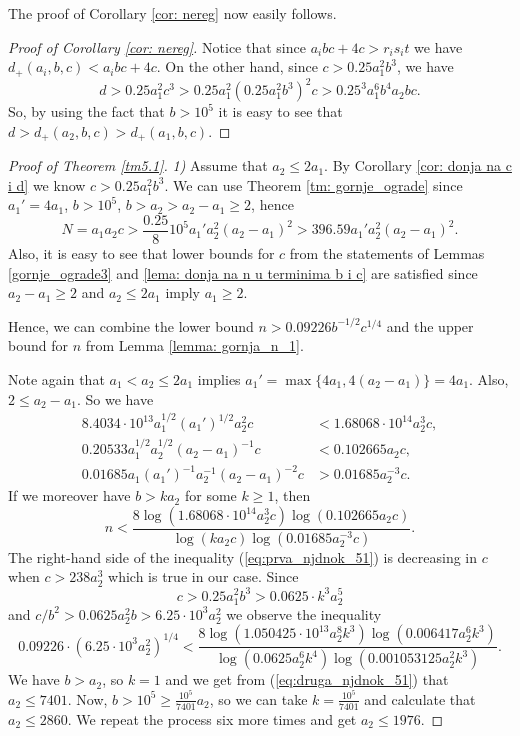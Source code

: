 \documentclass[12pt]{amsart}%
\theoremstyle{definition}
\theoremstyle{remark}
\theoremstyle{plain}
\begin{document}
The proof of Corollary \ref{cor: nereg} now easily follows.

\begin{proof}[Proof of Corollary \ref{cor: nereg}]
Notice that since $a_ibc+4c>r_is_it$ we have $d_+(a_i,b,c) < a_ibc + 4c$. On the other hand, since $c>0.25a_1^2b^3$, we have 
$$d>0.25a_1^2c^3>0.25a_1^2(0.25a_1^2b^3)^2c>0.25^3a_1^6b^4a_2bc.$$
So, by using the fact that $b>10^5$ it is easy to see that $d>d_+(a_2,b,c)>d_+(a_1,b,c)$.
\end{proof}



\begin{proof}[Proof of Theorem \ref{tm5.1}]
\emph{1)} Assume that $a_2\leq 2a_1$.
By Corollary \ref{cor: donja na c i d} we know $c>0.25a_1^2b^3$. We can use Theorem \ref{tm: gornje_ograde} since $a_1'=4a_1$, $b>10^5$, $b>a_2>a_2-a_1\geq 2$, hence 
$$N=a_1a_2c>\frac{0.25}{8}10^5a_1'a_2^2(a_2-a_1)^2>396.59a_1'a_2^2(a_2-a_1)^2.$$
Also, it is easy to see that lower bounds for $c$ from the statements of Lemmas \ref{gornje_ograde3}  and \ref{lema: donja na n u terminima b i c} are satisfied since $a_2-a_1\geq 2$ and $a_2\leq 2a_1$ imply $a_1\geq 2$.

Hence, we can combine the lower bound $n>0.09226b^{-1/2}c^{1/4}$ and the upper bound for $n$ from Lemma \ref{lemma: gornja_n_1}.

 Note again that $a_1<a_2\leq 2a_1$ implies $a_1'=\max\{4a_1,4(a_2-a_1)\}=4a_1$. Also, $2\leq a_2-a_1$. So we have
\begin{align*}
 8.4034\cdot 10^{13}a_1^{1/2}(a_1')^{1/2}a_2^2c&<1.68068\cdot 10^{14}a_2^3c,\\
 0.20533a_1^{1/2}a_2^{1/2}(a_2-a_1)^{-1}c&<0.102665a_2c,\\
 0.01685a_1(a_1')^{-1}a_2^{-1}(a_2-a_1)^{-2}c&>0.01685a_2^{-3}c.
\end{align*}
If we moreover have $b>ka_2$ for some $k\geq1$, then
\begin{equation}\label{eq:prva_njdnok_51}
    n<\frac{8\log(1.68068\cdot 10^{14}a_2^3c)\log(0.102665a_2c)}{\log(ka_2c)\log(0.01685a_2^{-3}c)}.
\end{equation}
The right-hand side of the inequality (\ref{eq:prva_njdnok_51}) is decreasing in $c$ when $c>238a_2^3$ which is true in our case. Since $$c>0.25a_1^2b^3>0.0625\cdot k^3a_2^5$$
and $c/b^2>0.0625a_2^2b>6.25\cdot 10^3a_2^2$ we observe the inequality
\begin{equation}\label{eq:druga_njdnok_51}
    0.09226\cdot (6.25\cdot 10^3a_2^2)^{1/4}<\frac{8\log(1.050425\cdot 10^{13}a_2^8k^3)\log(0.006417a_2^6k^3)}{\log(0.0625a_2^6k^4)\log(0.001053125a_2^2k^3)}.
\end{equation}
We have $b>a_2$, so $k=1$ and we get from (\ref{eq:druga_njdnok_51}) that $a_2\leq 7401$. Now, $b>10^5\geq \frac{10^5}{7401}a_2$, so we can take $k=\frac{10^5}{7401}$ and calculate that $a_2\leq2860$. We repeat the process six more times and get $a_2\leq 1976$.


\end{proof}
\end{document}
